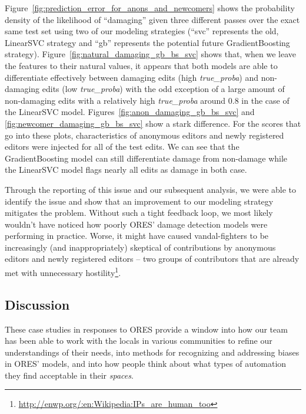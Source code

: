 

Figure~\ref{fig:prediction_error_for_anons_and_newcomers} shows the probability density of the likelihood of ``damaging'' given three different passes over the exact same test set using two of our modeling strategies (``svc'' represents the old, LinearSVC strategy and ``gb'' represents the potential future GradientBoosting strategy).  Figure~\ref{fig:natural_damaging_gb_bs_svc} shows that, when we leave the features to their natural values, it appears that both models are able to differentiate effectively between damaging edits (high \emph{true\_proba}) and non-damaging edits (low \emph{true\_proba}) with the odd exception of a large amount of non-damaging edits with a relatively high \emph{true\_proba} around 0.8 in the case of the LinearSVC model.  Figures~\ref{fig:anon_damaging_gb_bs_svc} and \ref{fig:newcomer_damaging_gb_bs_svc} show a stark difference.  For the scores that go into these plots, characteristics of anonymous editors and newly registered editors were injected for all of the test edits.  We can see that the GradientBoosting model can still differentiate damage from non-damage while the LinearSVC model flags nearly all edits as damage in both case.

Through the reporting of this issue and our subsequent analysis, we were able to identify the issue and show that an improvement to our modeling strategy mitigates the problem.  Without such a tight feedback loop, we most likely wouldn't have noticed how poorly ORES' damage detection models were performing in practice.  Worse, it might have caused vandal-fighters to be increasingly (and inappropriately) skeptical of contributions by anonymous editors and newly registered editors -- two groups of contributors that are already met with unnecessary hostility\footnote{\url{http://enwp.org/:en:Wikipedia:IPs_are_human_too}}\cite{halfaker2013rise}.

\subsection{Discussion}
These case studies in responses to ORES provide a window into how our team has been able to work with the locals in various communities to refine our understandings of their needs, into methods for recognizing and addressing biases in ORES' models, and into how people think about what types of automation they find acceptable in their \emph{spaces}.

